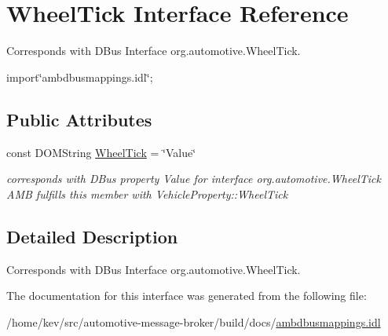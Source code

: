 \hypertarget{interfaceWheelTick}{\section{Wheel\+Tick Interface Reference}
\label{interfaceWheelTick}
}


Corresponds with D\+Bus Interface org.\+automotive.\+Wheel\+Tick.  




{\ttfamily import\char`\"{}ambdbusmappings.\+idl\char`\"{};}

\subsection*{Public Attributes}
\begin{DoxyCompactItemize}
\item 
\hypertarget{interfaceWheelTick_a22e201499e96886a09786aa8c42f08e9}{const D\+O\+M\+String \hyperlink{interfaceWheelTick_a22e201499e96886a09786aa8c42f08e9}{Wheel\+Tick} = \char`\"{}Value\char`\"{}}\label{interfaceWheelTick_a22e201499e96886a09786aa8c42f08e9}

\begin{DoxyCompactList}\small\item\em corresponds with D\+Bus property Value for interface org.\+automotive.\+Wheel\+Tick A\+M\+B fulfills this member with Vehicle\+Property\+::\+Wheel\+Tick \end{DoxyCompactList}\end{DoxyCompactItemize}


\subsection{Detailed Description}
Corresponds with D\+Bus Interface org.\+automotive.\+Wheel\+Tick. 

The documentation for this interface was generated from the following file\+:\begin{DoxyCompactItemize}
\item 
/home/kev/src/automotive-\/message-\/broker/build/docs/\hyperlink{ambdbusmappings_8idl}{ambdbusmappings.\+idl}\end{DoxyCompactItemize}
